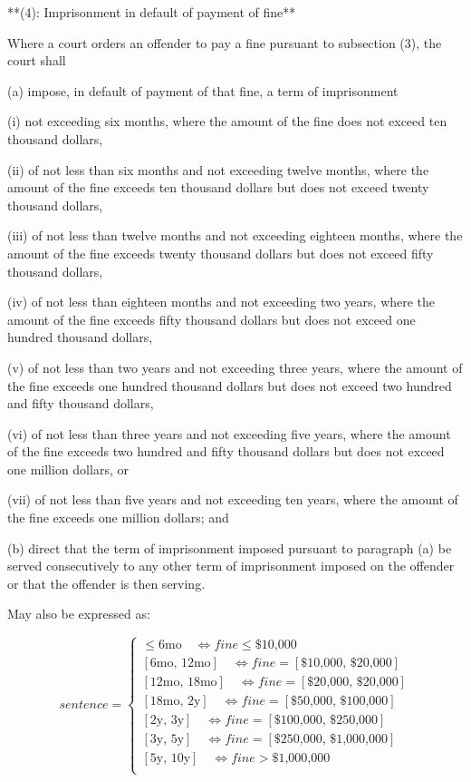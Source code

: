**(4): Imprisonment in default of payment of fine**

Where a court orders an offender to pay a fine pursuant to subsection (3), the court shall

(a) impose, in default of payment of that fine, a term of imprisonment

(i) not exceeding six months, where the amount of the fine does not exceed ten thousand dollars,

(ii) of not less than six months and not exceeding twelve months, where the amount of the fine exceeds ten thousand dollars but does not exceed twenty thousand dollars,

(iii) of not less than twelve months and not exceeding eighteen months, where the amount of the fine exceeds twenty thousand dollars but does not exceed fifty thousand dollars,

(iv) of not less than eighteen months and not exceeding two years, where the amount of the fine exceeds fifty thousand dollars but does not exceed one hundred thousand dollars,

(v) of not less than two years and not exceeding three years, where the amount of the fine exceeds one hundred thousand dollars but does not exceed two hundred and fifty thousand dollars,

(vi) of not less than three years and not exceeding five years, where the amount of the fine exceeds two hundred and fifty thousand dollars but does not exceed one million dollars, or

(vii) of not less than five years and not exceeding ten years, where the amount of the fine exceeds one million dollars; and

(b) direct that the term of imprisonment imposed pursuant to paragraph (a) be served consecutively to any other term of imprisonment imposed on the offender or that the offender is then serving.

May also be expressed as:

\begin{equation*}
		  sentence = \begin{cases}
		             \le \text{6mo} \quad  \iff fine \le \text{\$10,000} \\
		            [\text{6mo, 12mo}] \quad \iff fine = [\text{\$10,000, \$20,000}]\\
		            [\text{12mo, 18mo}] \quad \iff fine = [\text{\$20,000, \$20,000}]\\
		            [\text{18mo, 2y}] \quad \iff fine = [\text{\$50,000, \$100,000}]\\
		            [\text{2y, 3y}] \quad \iff fine = [\text{\$100,000, \$250,000}]\\
		            [\text{3y, 5y}] \quad \iff fine = [\text{\$250,000, \$1,000,000}]\\
		            [\text{5y, 10y}] \quad \iff fine > \text{\$1,000,000}\\
		       \end{cases}
		  \end{equation*}


